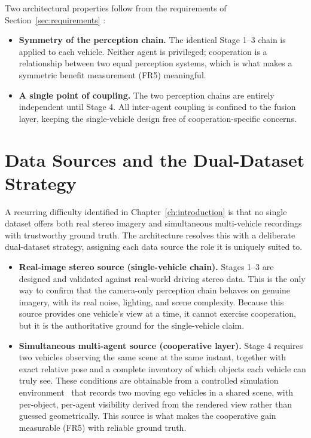 Two architectural properties follow from the requirements of
Section~\ref{sec:requirements} :

\begin{itemize}[leftmargin=*,itemsep=3pt]
  \item \textbf{Symmetry of the perception chain.} The identical Stage 1--3 chain
  is applied to each vehicle. Neither agent is privileged; cooperation is a
  relationship between two equal perception systems, which is what makes a
  symmetric benefit measurement (FR5) meaningful.
  \item \textbf{A single point of coupling.} The two perception chains are entirely
  independent until Stage 4. All inter-agent coupling is confined to the
  fusion layer, keeping the single-vehicle design free of cooperation-specific
  concerns.
\end{itemize}

\section{Data Sources and the Dual-Dataset Strategy}
\label{sec:data}

A recurring difficulty identified in Chapter~\ref{ch:introduction} is that no
single dataset offers both real stereo imagery and simultaneous
multi-vehicle recordings with trustworthy ground truth. The architecture resolves
this with a deliberate dual-dataset strategy, assigning each data source
the role it is uniquely suited to.

\begin{itemize}[leftmargin=*,itemsep=4pt]
  \item \textbf{Real-image stereo source (single-vehicle chain).} Stages 1--3 are
  designed and validated against real-world driving stereo data. This is the only
  way to confirm that the camera-only perception chain behaves on genuine imagery,
  with its real noise, lighting, and scene complexity. Because this source provides
  one vehicle's view at a time, it cannot exercise cooperation, but it is the
  authoritative ground for the single-vehicle claim.
  \item \textbf{Simultaneous multi-agent source (cooperative layer).} Stage 4
  requires two vehicles observing the same scene at the same instant,
  together with exact relative pose and a complete inventory of which objects each
  vehicle can truly see. These conditions are obtainable from a controlled
  simulation environment~\cite{dosovitskiy2017carla} that records two moving ego
  vehicles in a shared scene, with per-object, per-agent visibility derived from
  the rendered view rather than guessed geometrically. This source is what makes
  the cooperative gain measurable (FR5) with reliable ground truth.
\end{itemize}

